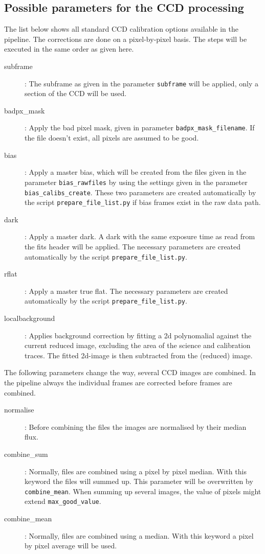 \documentclass[10pt,a4paper]{article}
\begin{document}
\subsection{Possible parameters for the CCD processing}
\label{Section:parameters_CCD_proc}
\noindent The list below shows all standard CCD calibration options available in the pipeline. The corrections are done on a pixel-by-pixel basis. The steps will be executed in the same order as given here.
\begin{description}
  \item[subframe] : The subframe as given in the parameter \verb|subframe| will be applied, only a section of the CCD will be used.
  \item[badpx\_mask] : Apply the bad pixel mask, given in parameter \verb|badpx_mask_filename|. If the file doesn't exist, all pixels are assumed to be good.
  \item[bias] : Apply a master bias, which will be created from the files given in the parameter \verb|bias_rawfiles| by using the settings given in the parameter \verb|bias_calibs_create|. These two parameters are created automatically by the script \verb|prepare_file_list.py| if bias frames exist in the raw data path.
  \item[dark] : Apply a master dark. A dark with the same exposure time as read from the fits header will be applied. The necessary parameters are created automatically by the script \verb|prepare_file_list.py|.
  \item[rflat] : Apply a master true flat. The necessary parameters are created automatically by the script \verb|prepare_file_list.py|.
  \item[localbackground] : Applies background correction by fitting a 2d polynomalial against the current reduced image, excluding the area of the science and calibration traces. The fitted 2d-image is then subtracted from the (reduced) image.
\end{description}

\noindent The following parameters change the way, several CCD images are combined. In the pipeline always the individual frames are corrected before frames are combined.
\begin{description}
  \item[normalise] : Before combining the files the images are normalised by their median flux.
  \item[combine\_sum] : Normally, files are combined using a pixel by pixel median. With this keyword the files will summed up. This parameter will be overwritten by \verb|combine_mean|. When summing up several images, the value of pixels might extend \verb|max_good_value|.
  \item[combine\_mean] : Normally, files are combined using a median. With this keyword a pixel by pixel average will be used.
\end{description}
\end{document}
